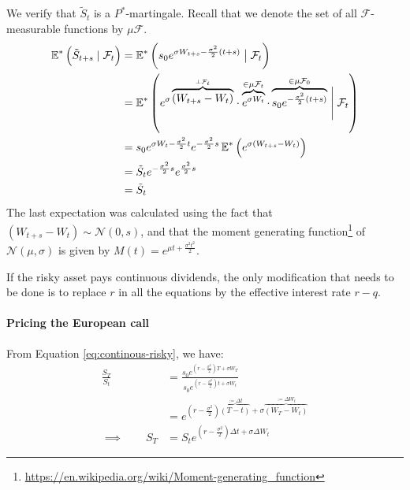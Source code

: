 We verify that $ \tilde{S}_t $ is a $ P^* $-martingale. Recall that we denote the set of all $ \mathcal{F} $-measurable functions by $ \mu \mathcal{F} $.
\begin{align*}
	\operatorname{\mathbb{E}}^* \left( \tilde{S}_{t+s} \mid \mathcal{F}_t \right)  &=  \operatorname{\mathbb{E}}^* \left( s_0 e^{\sigma W_{t+s} - \frac{\sigma^2}{2} (t+s) } \bigm| \mathcal{F}_t \right)  \\
	&=  \operatorname{\mathbb{E}}^* \left( e^{\sigma \overbrace{( W_{t+s} - W_{t} )}^{\perp \mathcal{F}_t} }
	\cdot  \overbrace{e^{ \sigma W_t}}^{\in \mu \mathcal{F}_t}
	\cdot  \overbrace{s_0 e^{- \frac{\sigma^2}{2} (t+s)}}^{\in \mu \mathcal{F}_0} \Biggm| \mathcal{F}_t \right)  \\
	&=  s_0 e^{ \sigma W_t - \frac{\sigma^2}{2} t } e^{ - \frac{\sigma^2}{2} s }  \operatorname{\mathbb{E}}^* \left( e^{\sigma ( W_{t+s} - W_{t} ) } \right)  \\
	&=  \tilde{S}_t e^{ - \frac{\sigma^2}{2} s } e^{ \frac{\sigma^2}{2} s }  \\
	&=  \tilde{S}_t
\end{align*}
The last expectation was calculated using the fact that $ ( W_{t+s} - W_{t} ) \sim \mathcal{N}(0, s) $, and that the moment generating function\footnote{\url{https://en.wikipedia.org/wiki/Moment-generating_function}} of $ \mathcal{N}(\mu, \sigma) $ is given by $ M(t) = e^{\mu t + \frac{\sigma^2 t^2}{2}} $.


\begin{rem}
	\label{rem:continuous-dividend}
	If the risky asset pays continuous dividends, the only modification that needs to be done is to replace $ r $ in all the equations by the effective interest rate $ r - q $.
\end{rem}



\paragraph{Pricing the European call}
From Equation \ref{eq:continous-risky}, we have:
\begin{align*}
	\frac{S_T}{S_t}  &=  \frac{s_0 e^{ ( r - \frac{\sigma^2}{2} ) T + \sigma W_T }}{s_0 e^{ ( r - \frac{\sigma^2}{2} ) t + \sigma W_t }}  \\
	&=  e^{ ( r - \frac{\sigma^2}{2} ) \overbrace{( T-t )}^{\coloneqq \Delta t} + \sigma \overbrace{( W_T - W_t )}^{\coloneqq \Delta W_t} }  \\
	\implies  \qquad S_T  &=  S_t e^{ ( r - \frac{\sigma^2}{2} ) \Delta t + \sigma \Delta W_t }
\end{align*}

